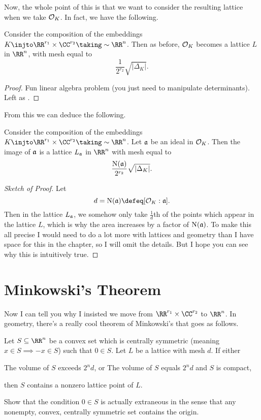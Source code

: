 Now, the whole point of this is that we want to consider the resulting lattice
when we take $\OO_K$. In fact, we have the following.
\begin{lemma}
	\label{lem:vol_OK_mesh}
	Consider the composition of the embeddings $K \injto \RR^{r_1} \times \CC^{r_2} \taking\sim \RR^n$.
	Then as before, $\OO_K$ becomes a lattice $L$ in $\RR^n$, with mesh equal to
	\[ \frac{1}{2^{r_2}} \sqrt{\left\lvert \Delta_K \right\rvert}. \]
\end{lemma}
\begin{proof}
	Fun linear algebra problem (you just need to manipulate determinants).
	Left as .
\end{proof}
From this we can deduce the following.
\begin{lemma}
	Consider the composition of the embeddings $K \injto \RR^{r_1} \times \CC^{r_2} \taking\sim \RR^n$.
	Let $\aa$ be an ideal in $\OO_K$.
	Then the image of $\aa$ is a lattice $L_\aa$ in $\RR^n$ with mesh equal to
	\[ \frac{\Norm(\aa)}{2^{r_2}} \sqrt{\left\lvert \Delta_K \right\rvert}. \]
\end{lemma}
\begin{proof}[Sketch of Proof]
	Let \[ d = \Norm(\aa) \defeq [\OO_K : \aa]. \]
	Then in the lattice $L_\aa$, we somehow only take $\frac 1d$th of the points
	which appear in the lattice $L$, which is why the area increases by a factor of $\Norm(\aa)$.
	To make this all precise I would need to do a lot more with lattices and geometry
	than I have space for this in the chapter, so I will omit the details.
	But I hope you can see why this is intuitively true.
\end{proof}

\section{Minkowski's Theorem}
Now I can tell you why I insisted we move from $\RR^{r_1} \times \CC^{r_2}$ to $\RR^n$.
In geometry, there's a really cool theorem of Minkowski's that goes as follows.
\begin{theorem}
	[Minkowski]
	Let $S \subseteq \RR^n$ be a convex set which is centrally symmetric (meaning $x \in S \implies -x \in S$)
	such that $0 \in S$.
	Let $L$ be a lattice with mesh $d$.
	If either
	\begin{enumerate}[(a)]
		\ii The volume of $S$ exceeds $2^n d$, or
		\ii The volume of $S$ equals $2^n d$ and $S$ is compact,
	\end{enumerate}
	then $S$ contains a nonzero lattice point of $L$.
\end{theorem}
\begin{ques}
	Show that the condition $0 \in S$ is actually extraneous
	in the sense that any nonempty, convex, centrally symmetric set contains the origin.
\end{ques}

